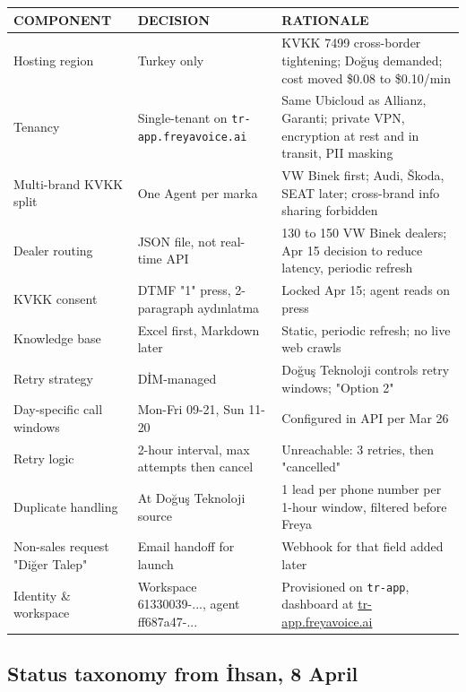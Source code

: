 \documentclass[10pt,a4paper]{article}
\begin{document}
\begin{tabularx}{\linewidth}{@{}L{3.2cm}L{3.4cm}X@{}}
\toprule
{}\textbf{\color{white}\footnotesize COMPONENT} & \textbf{\color{white}\footnotesize DECISION} & \textbf{\color{white}\footnotesize RATIONALE} \\
\midrule
Hosting region          & Turkey only            & KVKK 7499 cross-border tightening; Doğuş demanded; cost moved \$0.08 to \$0.10/min \\
Tenancy                 & Single-tenant on \texttt{tr-app.freyavoice.ai}  & Same Ubicloud as Allianz, Garanti; private VPN, encryption at rest and in transit, PII masking \\
Multi-brand KVKK split  & One Agent per marka    & VW Binek first; Audi, Škoda, SEAT later; cross-brand info sharing forbidden \\
Dealer routing          & JSON file, not real-time API & 130 to 150 VW Binek dealers; Apr 15 decision to reduce latency, periodic refresh \\
KVKK consent            & DTMF "1" press, 2-paragraph aydınlatma & Locked Apr 15; agent reads on press \\
Knowledge base          & Excel first, Markdown later & Static, periodic refresh; no live web crawls \\
Retry strategy          & DİM-managed             & Doğuş Teknoloji controls retry windows; "Option 2" \\
Day-specific call windows & Mon-Fri 09-21, Sun 11-20 & Configured in API per Mar 26 \\
Retry logic             & 2-hour interval, max attempts then cancel & Unreachable: 3 retries, then "cancelled" \\
Duplicate handling      & At Doğuş Teknoloji source & 1 lead per phone number per 1-hour window, filtered before Freya \\
Non-sales request "Diğer Talep" & Email handoff for launch & Webhook for that field added later \\
Identity \& workspace   & Workspace 61330039-..., agent ff687a47-... & Provisioned on \texttt{tr-app}, dashboard at \href{https://tr-app.freyavoice.ai}{tr-app.freyavoice.ai} \\
\bottomrule
\end{tabularx}

\subsection{Status taxonomy from İhsan, 8 April}
\end{document}
